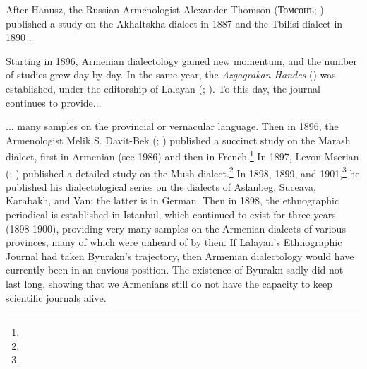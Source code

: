 After Hanusz, the Russian Armenologist Alexander Thomson (Томсонъ; ) published a study on the Akhaltskha dialect in 1887 \citep{Thomson-1887-Karin} and the Tbilisi dialect in 1890 \citep{Thomson-1890-Tiflis}. 

Starting in 1896, Armenian dialectology gained   new momentum, and the number of studies grew day by day. In the same year, the \textit{Azgagrakan Handes} () was established, under the editorship of Lalayan (; ). To this day, the journal continues to provide... 



\begin{adjarianpage}\label{page:3}\end{adjarianpage}%

... many samples on the provincial or vernacular language. Then in 1896, the Armenologist Melik S. Davit-Bek (; ) published a succinct study on the Marash dialect, first in Armenian (see  1986) and then in French.\footnote{} In 1897, Levon Mserian (; ) published a detailed study on the Mush dialect.\footnote{} In 1898, 1899, and 1901,\footnote{} he published his dialectological series on the dialects of Aslanbeg, Suceava, Karabakh, and Van; the latter is in German. Then in 1898, the  ethnographic periodical is established in Istanbul, which continued to exist for three years (1898-1900), providing very many samples on the Armenian dialects of various provinces, many of which were unheard of by then. If Lalayan's Ethnographic Journal had taken Byurakn's trajectory, then Armenian dialectology would have currently been in an envious position. The existence of Byurakn sadly did not last long, showing that we Armenians still do not have the capacity to keep scientific journals alive. 

